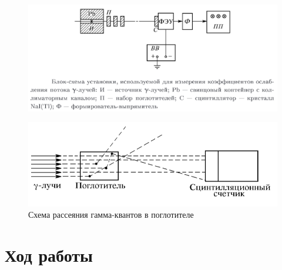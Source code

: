 \documentclass[a4paper]{article}
\begin{document}
\begin{figure}[H]
    \begin{center}
    \includegraphics[scale = 0.8]{setup1.png}
    \caption{}
    \label{setup1}
    \end{center}
\end{figure}

\begin{figure}[H]
    \begin{center}
    \includegraphics[scale = 0.8]{setup2.png}
    \caption{Схема рассеяния гамма-квантов в поглотителе}
    \label{setup2}
    \end{center}
\end{figure}



\section{Ход работы}
\end{document}

